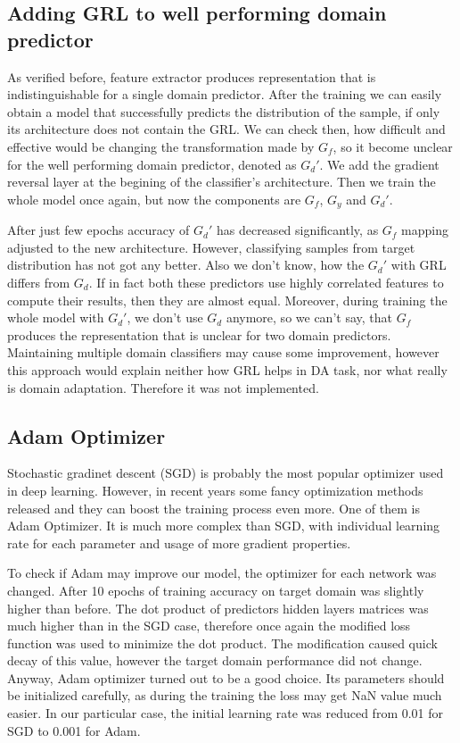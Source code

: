\documentclass{article}
\begin{document}
\subsection{Adding GRL to well performing domain predictor}
As verified before, feature extractor produces representation that is indistinguishable for a single domain predictor. After the training we can easily obtain a model that successfully predicts the distribution of the sample, if only its architecture does not contain the GRL. We can check then, how difficult and effective would be changing the transformation made by $G_{f}$, so it become unclear for the well performing domain predictor, denoted as $G_{d}'$. We add the gradient reversal layer at the begining of the classifier's architecture. Then we train the whole model once again, but now the components are $G_{f}$, $G_{y}$ and $G_{d}'$. 
\par
After just few epochs accuracy of $G_{d}'$ has decreased significantly, as $G_{f}$ mapping adjusted to the new architecture. However, classifying samples from target distribution has not got any better. Also we don't know, how the $G_{d}'$ with GRL differs from $G_{d}$. If in fact both these predictors use highly correlated features to compute their results, then they are almost equal. Moreover, during training the whole model with $G_{d}'$, we don't use $G_{d}$ anymore, so we can't say, that $G_{f}$ produces the representation that is unclear for two domain predictors. Maintaining multiple domain classifiers may cause some improvement, however this approach would explain neither how GRL helps in DA task, nor what really is domain adaptation. Therefore it was not implemented.

\subsection{Adam Optimizer}
Stochastic gradinet descent (SGD) is probably the most popular optimizer used in deep learning. However, in recent years some fancy optimization methods released and they can boost the training process even more. One of them is Adam Optimizer. It is much more complex than SGD, with individual learning rate for each parameter and usage of more gradient properties. 
\par
To check if Adam may improve our model, the optimizer for each network was changed. After 10 epochs of training accuracy on target domain was slightly higher than before. The dot product of predictors hidden layers matrices was much higher than in the SGD case, therefore once again the modified loss function was used to minimize the dot product. The modification caused quick decay of this value, however the target domain performance did not change. Anyway, Adam optimizer turned out to be a good choice. Its parameters should be initialized carefully, as during the training the loss may get NaN value much easier. In our particular case, the initial learning rate was reduced from 0.01 for SGD to 0.001 for Adam.
\end{document}

